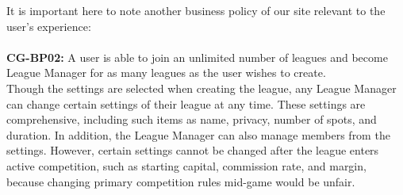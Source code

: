 It is important here to note another business policy of our site relevant to the user's experience: \\ \\
\textbf{CG-BP02:} A user is able to join an unlimited number of leagues and become League Manager for as many leagues as the user wishes to create. \\

Though the settings are selected when creating the league, any League Manager can change certain settings of their league at any time. These settings are comprehensive, including such items as name, privacy, number of spots, and duration. In addition, the League Manager can also manage members from the settings. However, certain settings cannot be 
changed after the league enters active competition, such as starting capital, commission rate, and margin, because changing primary competition rules mid-game would be unfair.\\

